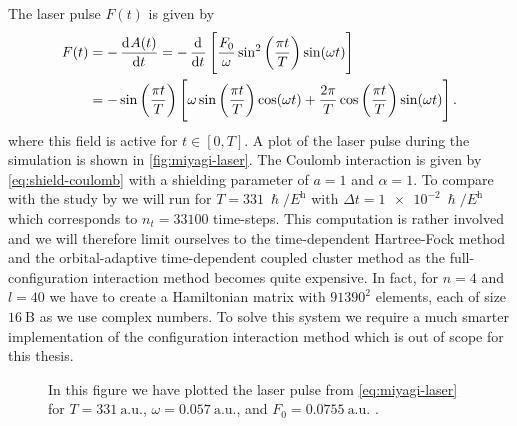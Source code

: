         The laser pulse $F(t)$ is given by \cite{miyagi_and_madsen}
        \begin{align}
            F(t)
            &= -\dod[]{A(t)}{t}
            = -\dod[]{}{t}\brak{
                \frac{F_0}{\omega}
                \sin^2\para{\frac{\pi t}{T}}
                \sin(\omega t)
            }
            \\
            &=
            -\sin\para{\frac{\pi t}{T}}\brak{
                \omega \sin\para{\frac{\pi t}{T}}
                \cos(\omega t)
                + \frac{2\pi}{T}
                \cos\para{\frac{\pi t}{T}}
                \sin(\omega t)
            }.
            \label{eq:miyagi-laser}
        \end{align}
        where this field is active for $t \in [0, T]$.
        A plot of the laser pulse during the simulation is shown in
        \autoref{fig:miyagi-laser}.
        The Coulomb interaction is given by \autoref{eq:shield-coulomb} with a
        shielding parameter of $a = 1$ and $\alpha = 1$.
        To compare with the study by \citeauthor{miyagi_and_madsen} we will run
        for $T = \SI{331}{\hslash/\hartree}$ with $\Delta t =
        \SI{1e-2}{\hslash/\hartree}$ which corresponds to $n_t = 33100$
        time-steps.
        This computation is rather involved and we will therefore limit
        ourselves to the time-dependent Hartree-Fock method and the
        orbital-adaptive time-dependent coupled cluster method as the
        full-configuration interaction method becomes quite expensive.
        In fact, for $n = 4$ and $l = 40$ we have to create a Hamiltonian
        matrix with $91390^2$ elements, each of size $\SI{16}{\text{B}}$ as
        we use complex numbers.
        To solve this system we require a much smarter implementation of the
        configuration interaction method which is out of scope for this
        thesis.

        \begin{figure}
            \centering
            \caption{In this figure we have plotted the laser pulse from
            \autoref{eq:miyagi-laser} for $T = \SI{331}{\text{a.u.}}$,
            $\omega = \SI{0.057}{\text{a.u.}}$, and $F_0 =
            \SI{0.0755}{\text{a.u.}}$ \cite{miyagi_and_madsen}.}
            \label{fig:miyagi-laser}
        \end{figure}


